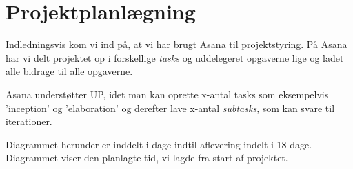 \chapter{Projektplanlægning}

Indledningsvis kom vi ind på, at vi har brugt Asana til projektstyring.
På Asana har vi delt projektet op i forskellige \textit{tasks} og uddelegeret opgaverne lige og ladet alle bidrage til alle opgaverne.

\noindent
Asana understøtter UP, idet man kan oprette x-antal tasks som eksempelvis 'inception' og 'elaboration' og derefter lave x-antal \textit{subtasks}, som kan svare til iterationer.

\noindent
Diagrammet herunder er inddelt i dage indtil aflevering indelt i 18 dage. 
\\ Diagrammet viser den planlagte tid, vi lagde fra start af projektet.
%
%

